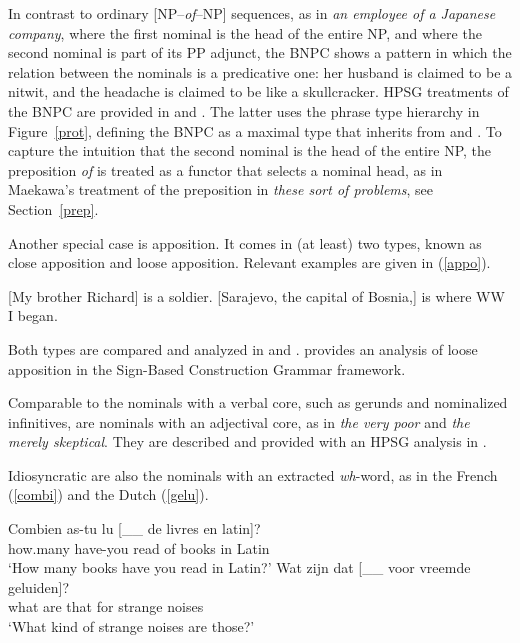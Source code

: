 \documentclass[output=paper
	        ,collection
	        ,collectionchapter
 	        ,biblatex
                ,babelshorthands
                ,newtxmath
                ,draftmode
                ,colorlinks, citecolor=brown
]{langscibook}
\begin{document}
\noindent
In contrast to ordinary [NP--\emph{of}--NP] sequences, 
as in \emph{an employee of a Japanese company}, where the 
first nominal is the head of the entire NP, and where the second 
nominal is part of its PP adjunct, the BNPC shows a pattern
in which the relation between the nominals is a predicative one: 
her husband is claimed to be a nitwit, and the headache is claimed to be 
like a skullcracker. HPSG treatments of the BNPC are provided in
\citet{KimSells14} and \citet{VanEynde18}. The latter uses 
the phrase type hierarchy in Figure~\ref{prot}, defining the BNPC as 
a maximal type that inherits from  and 
. To capture the intuition that the second
nominal is the head of the entire NP, the preposition \emph{of} is 
treated as a functor that selects a nominal head, as in Maekawa's treatment of 
the preposition in \emph{these sort of problems}, see Section~\ref{prep}. 

Another special case is apposition. It comes in (at least) two types, known as 
close apposition and loose apposition. Relevant examples are given in (\ref{appo}). 

\begin{exe} 
\ex\label{appo} 
\begin{xlist} 
\ex  {}[My brother Richard] is a soldier.  
\ex  {}[Sarajevo, the capital of Bosnia,] is where WW I began.
\end{xlist} 
\end{exe}

\noindent
Both types are compared and analyzed in \citet{Kim12} and \citet{Kim14}. 
\citet{VanEyndeKim16} provides an analysis of loose apposition in the 
Sign-Based Construction Grammar framework. 

Comparable to the nominals with a verbal core, such as gerunds and nominalized 
infinitives, are nominals with an adjectival core, as in \emph{the very poor} and 
\emph{the merely skeptical}. They are described and provided with an HPSG analysis 
in \citet{ArnoldSpencer2015}.

Idiosyncratic are also the nominals with an extracted \emph{wh}-word, as in 
the French (\ref{combi}) and the Dutch (\ref{gelu}). 

\begin{exe} 
\ex\label{combi}  
\gll   Combien as-tu lu [\_\_ de livres en latin]?  \\
       how.many have-you read {} of books in Latin  \\ 
\trans `How many books have you read in Latin?' 
\ex\label{gelu}
\gll   Wat zijn dat [\_\_ voor vreemde geluiden]? \\
       what are that {} for strange noises        \\ 
\trans `What kind of strange noises are those?'  
\end{exe} 
\end{document}
